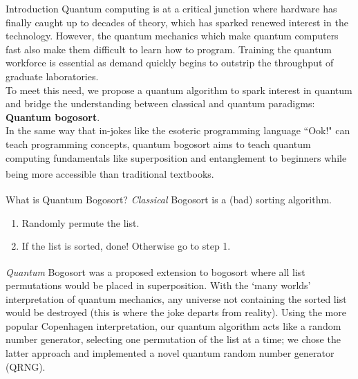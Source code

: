 \documentclass{beamer}
\begin{document}
  \begin{frame}{Introduction}
      Quantum computing is at a critical junction where hardware has finally caught up to decades of theory, which has sparked renewed interest in the technology. However, the quantum mechanics which make quantum computers fast also make them difficult to learn how to program.
      Training the quantum workforce is essential as demand quickly begins to outstrip the throughput of graduate laboratories. \\
      To meet this need, we propose a quantum algorithm to spark interest in quantum and bridge the understanding between classical and quantum paradigms: \textbf{Quantum bogosort}. \\
      In the same way that in-jokes like the esoteric programming language ``Ook!" can teach programming concepts, quantum bogosort aims to teach quantum computing fundamentals like superposition and entanglement to beginners while being more accessible than traditional textbooks\textsuperscript{\color{blue}\cite{nielsen_chuang_2021}}.
  \end{frame}
  
  \begin{frame}{What is Quantum Bogosort?}
    \textit{Classical} Bogosort\textsuperscript{\color{blue}\cite{gruber_holzer_ruepp_2007}} is a (bad) sorting algorithm.
    \begin{enumerate}
        \item Randomly permute the list.
        \item If the list is sorted, done! Otherwise go to step 1.
    \end{enumerate}
    \vspace{10}
    \textit{Quantum} Bogosort\textsuperscript{\color{blue}\cite{the_other_tree_2009}} was a proposed extension to bogosort where all list permutations would be placed in superposition. With the `many worlds' interpretation of quantum mechanics, any universe not containing the sorted list would be destroyed (this is where the joke departs from reality). Using the more popular Copenhagen interpretation, our quantum algorithm acts like a random number generator, selecting one permutation of the list at a time; we chose the latter approach and implemented a novel quantum random number generator (QRNG).
  \end{frame}
  
\end{document}
